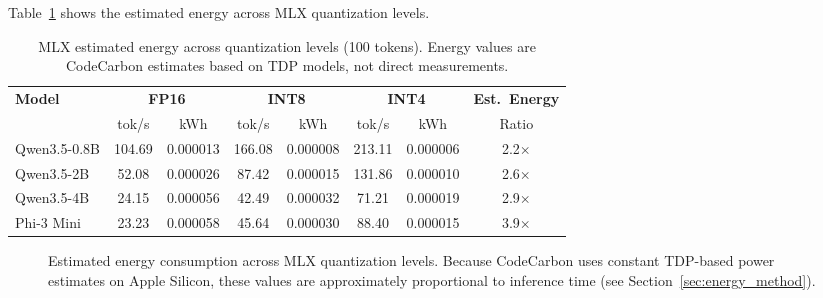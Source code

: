 \documentclass[11pt,a4paper]{article}
\begin{document}
Table~\ref{tab:mlx_energy} shows the estimated energy across MLX quantization levels.

\begin{table}[htbp]
\centering
\caption{MLX estimated energy across quantization levels (100 tokens). Energy values are CodeCarbon estimates based on TDP models, not direct measurements.}
\label{tab:mlx_energy}
\begin{tabular}{l|ccccccc}
\toprule
\textbf{Model} & \multicolumn{2}{c}{\textbf{FP16}} & \multicolumn{2}{c}{\textbf{INT8}} & \multicolumn{2}{c}{\textbf{INT4}} & \textbf{Est.\ Energy} \\
\cmidrule(lr){2-3} \cmidrule(lr){4-5} \cmidrule(lr){6-7}
& tok/s & kWh & tok/s & kWh & tok/s & kWh & Ratio \\
\midrule
Qwen3.5-0.8B & 104.69 & 0.000013 & 166.08 & 0.000008 & 213.11 & 0.000006 & 2.2$\times$ \\
Qwen3.5-2B & 52.08 & 0.000026 & 87.42 & 0.000015 & 131.86 & 0.000010 & 2.6$\times$ \\
Qwen3.5-4B & 24.15 & 0.000056 & 42.49 & 0.000032 & 71.21 & 0.000019 & 2.9$\times$ \\
Phi-3 Mini & 23.23 & 0.000058 & 45.64 & 0.000030 & 88.40 & 0.000015 & 3.9$\times$ \\
\bottomrule
\end{tabular}
\end{table}

\begin{figure}[htbp]
\centering
{}
\caption{Estimated energy consumption across MLX quantization levels. Because CodeCarbon uses constant TDP-based power estimates on Apple Silicon, these values are approximately proportional to inference time (see Section~\ref{sec:energy_method}).}
\label{fig:energy_quantization}
\end{figure}
\end{document}
